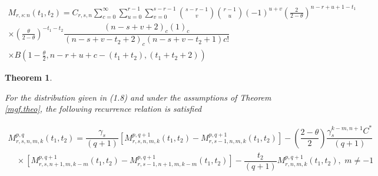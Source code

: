\documentclass[11pt,a4paper]{article}
\numberwithin{equation}{section}
\newtheorem{theorem}{Theorem}[section]
\begin{document}
		\begin{eqnarray} 

			M_{r,s:n}(t_{1},t_{2}) =C_{r,s,n}\sum_{c=0}^{\infty}\sum_{u=0}^{r-1}\sum_{v=0}^{s-r-1}\binom{s-r-1}{v}

			\binom{r-1}{u}(-1)^{u+v}\left(\frac{2}{2-\theta}\right)^{n-r+u+1-t_{1}}\nonumber\\

			\times\left(\frac{\theta}{2-\theta}\right)^{-t_{1}-t_{2}}\dfrac{\left({n-s+v+2}\right)_{c}(1)_{c}}{\left(n-s+v-t_{2}+2\right)_{c}\left(n-s+v-t_{2}+1\right){c}!}\nonumber\\ \times B\left(1-\frac{\theta}{2},n-r+u+c-(t_{1}+t_{2}),(t_{1}+t_{2}+2)\right)\nonumber

		\end{eqnarray}



	\begin{theorem}\label{theo3.2}

		For the distribution given in (1.8) and under the assumptions of Theorem \ref{mgf.theo}, the following recurrence relation is satisfied

		\begin{eqnarray}

			M_{r,s,n,m,k}^{p,q}(t_{1},t_{2})=\dfrac{\gamma_{s}}{(q+1)}\left[M_{r,s,n,m,k}^{p,q+1}(t_{1},t_{2})-M_{r,s-1,n,m,k}^{p,q+1}(t_{1},t_{2})\right]-\left(\dfrac{2-\theta}{2}\right)\dfrac{\gamma_{s}^{k-m,n+1}C^{*}}{(q+1)}\nonumber \\ \,\,\,\,\,\,

			\times\left[M_{r,s,n+1,m,k-m}^{p,q+1}(t_{1},t_{2})-M_{r,s-1,n+1,m,k-m}^{p,q+1}(t_{1},t_{2})\right]- \dfrac{t_{2}}{(q+1)}M_{r,n,m,k}^{p,q+1}(t_{1},t_{2}),\,\, m\ne-1\,\,\

		\end{eqnarray}

	\end{theorem}
\end{document}
